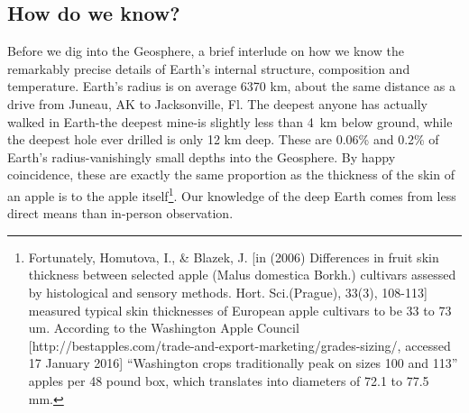 \subsection{How do we know?}
Before we dig into the Geosphere, a brief interlude on how we know the remarkably precise details of Earth's internal structure, composition and temperature. Earth's radius is on average 6370 km, about the same distance as a drive from Juneau, AK to Jacksonville, Fl. The deepest anyone has actually walked in Earth-the deepest mine-is slightly less than \SI{4}{\kilo\metre} below ground, while the deepest hole ever drilled is only 12 km deep. These are 0.06\% and 0.2\% of Earth's radius-vanishingly small depths into the Geosphere. By happy coincidence, these are exactly the same proportion as the thickness of the skin of an apple is to the apple itself\footnote{Fortunately, Homutova, I., \& Blazek, J. [in (2006) Differences in fruit skin thickness between selected apple (Malus domestica Borkh.) cultivars assessed by histological and sensory methods. Hort. Sci.(Prague), 33(3), 108-113] measured typical skin thicknesses of European apple cultivars to be 33 to 73 um. According to the Washington Apple Council [http://bestapples.com/trade-and-export-marketing/grades-sizing/, accessed 17 January 2016] ``Washington crops traditionally peak on sizes 100 and 113'' apples per 48 pound box, which translates into diameters of 72.1 to 77.5 mm.}. Our knowledge of the deep Earth comes from less direct means than in-person observation.\\

